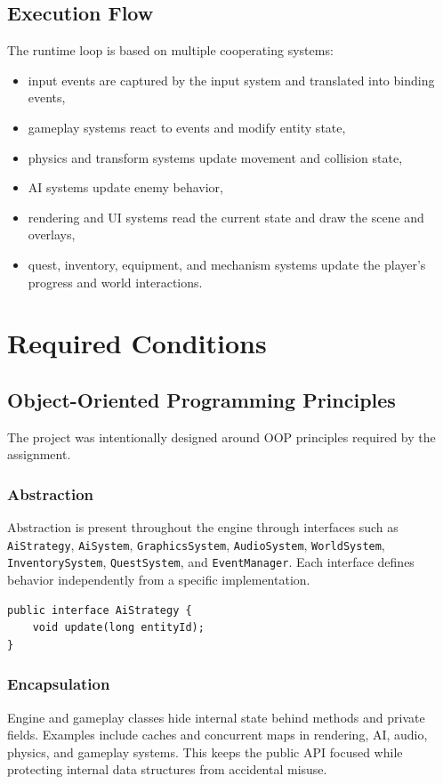 \documentclass[12pt]{extarticle}
\begin{document}
\subsection{Execution Flow}
The runtime loop is based on multiple cooperating systems:
\begin{itemize}[leftmargin=1.5em]
    \item input events are captured by the input system and translated into binding events,
    \item gameplay systems react to events and modify entity state,
    \item physics and transform systems update movement and collision state,
    \item AI systems update enemy behavior,
    \item rendering and UI systems read the current state and draw the scene and overlays,
    \item quest, inventory, equipment, and mechanism systems update the player's progress and world interactions.
\end{itemize}

\section{Required Conditions}
\subsection{Object-Oriented Programming Principles}
The project was intentionally designed around OOP principles required by the assignment.

\subsubsection{Abstraction}
Abstraction is present throughout the engine through interfaces such as \texttt{AiStrategy}, \texttt{AiSystem}, \texttt{GraphicsSystem}, \texttt{AudioSystem}, \texttt{WorldSystem}, \texttt{InventorySystem}, \texttt{QuestSystem}, and \texttt{EventManager}. Each interface defines behavior independently from a specific implementation.

\begin{lstlisting}[caption={Interface-based abstraction through the AI strategy contract}]
public interface AiStrategy {
    void update(long entityId);
}
\end{lstlisting}

\subsubsection{Encapsulation}
Engine and gameplay classes hide internal state behind methods and private fields. Examples include caches and concurrent maps in rendering, AI, audio, physics, and gameplay systems. This keeps the public API focused while protecting internal data structures from accidental misuse.
\end{document}
